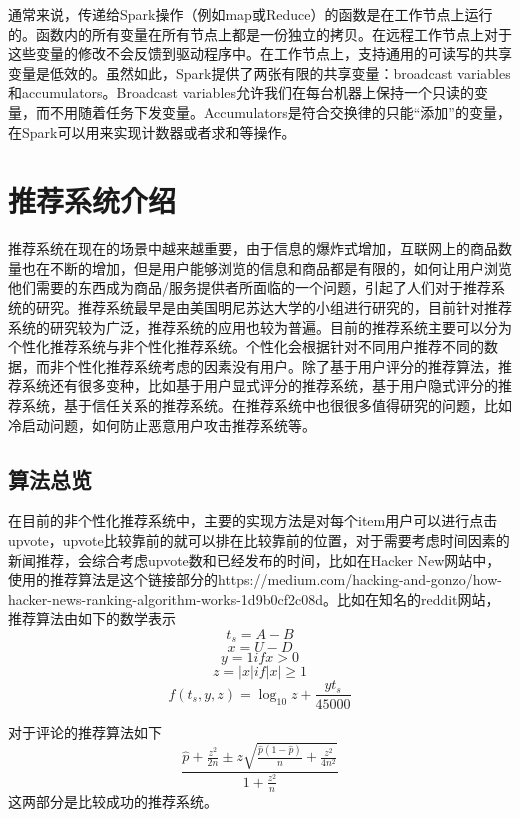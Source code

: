 通常来说，传递给Spark操作（例如map或Reduce）的函数是在工作节点上运行的。函数内的所有变量在所有节点上都是一份独立的拷贝。在远程工作节点上对于这些变量的修改不会反馈到驱动程序中。在工作节点上，支持通用的可读写的共享变量是低效的。虽然如此，Spark提供了两张有限的共享变量：broadcast variables和accumulators。Broadcast variables允许我们在每台机器上保持一个只读的变量，而不用随着任务下发变量。Accumulators是符合交换律的只能“添加”的变量，在Spark可以用来实现计数器或者求和等操作。

\section{推荐系统介绍}
推荐系统在现在的场景中越来越重要，由于信息的爆炸式增加，互联网上的商品数量也在不断的增加，但是用户能够浏览的信息和商品都是有限的，如何让用户浏览他们需要的东西成为商品/服务提供者所面临的一个问题，引起了人们对于推荐系统的研究。推荐系统最早是由美国明尼苏达大学的小组进行研究的，目前针对推荐系统的研究较为广泛，推荐系统的应用也较为普遍。目前的推荐系统主要可以分为个性化推荐系统与非个性化推荐系统。个性化会根据针对不同用户推荐不同的数据，而非个性化推荐系统考虑的因素没有用户。除了基于用户评分的推荐算法，推荐系统还有很多变种，比如基于用户显式评分的推荐系统，基于用户隐式评分的推荐系统，基于信任关系的推荐系统。在推荐系统中也很很多值得研究的问题，比如冷启动问题，如何防止恶意用户攻击推荐系统等。
\subsection{算法总览}
在目前的非个性化推荐系统中，主要的实现方法是对每个item用户可以进行点击upvote，upvote比较靠前的就可以排在比较靠前的位置，对于需要考虑时间因素的新闻推荐，会综合考虑upvote数和已经发布的时间，比如在Hacker New网站中，使用的推荐算法是这个链接部分的https://medium.com/hacking-and-gonzo/how-hacker-news-ranking-algorithm-works-1d9b0cf2c08d。比如在知名的reddit网站，推荐算法由如下的数学表示
$$    t_s = A - B$$
$$x = U - D$$
$$ y = 1 if x > 0$$
$$z = |x| if |x| \geq 1$$
\begin{equation}
f(t_s, y, z) = \log_{10}z + \frac{yt_s}{45000}    
\end{equation}

对于评论的推荐算法如下
\begin{equation}
    \frac{\hat{p}+\frac{z^2}{2n}\pm z\sqrt{\frac{\hat{p}(1-\hat{p})}{n}+\frac{z^2}{4n^2}}}{1+\frac{z^2}{n}}
\end{equation}
这两部分是比较成功的推荐系统。

